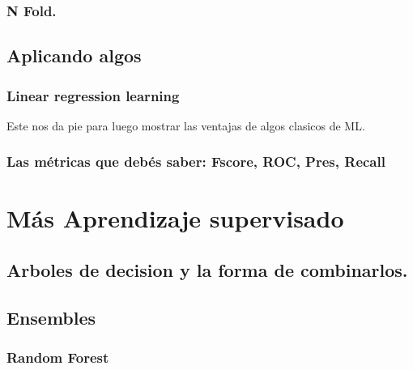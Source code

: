 \documentclass[]{book}
\begin{document}
\hypertarget{n-fold.}{%
\subsection{N Fold.}\label{n-fold.}}

\hypertarget{aplicando-algos}{%
\section{Aplicando algos}\label{aplicando-algos}}

\hypertarget{linear-regression-learning}{%
\subsection{Linear regression learning}\label{linear-regression-learning}}

Este nos da pie para luego mostrar las ventajas de algos clasicos de ML.

\hypertarget{las-metricas-que-debes-saber-fscore-roc-pres-recall}{%
\subsection{Las métricas que debés saber: Fscore, ROC, Pres, Recall}\label{las-metricas-que-debes-saber-fscore-roc-pres-recall}}

\hypertarget{mas-aprendizaje-supervisado}{%
\chapter{Más Aprendizaje supervisado}\label{mas-aprendizaje-supervisado}}

\hypertarget{arboles-de-decision-y-la-forma-de-combinarlos.}{%
\section{Arboles de decision y la forma de combinarlos.}\label{arboles-de-decision-y-la-forma-de-combinarlos.}}

\hypertarget{ensembles}{%
\section{Ensembles}\label{ensembles}}

\hypertarget{random-forest}{%
\subsection{Random Forest}\label{random-forest}}
\end{document}

